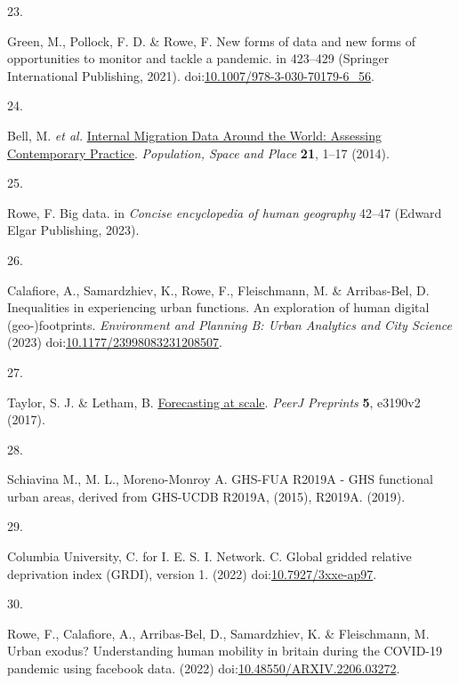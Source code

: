 \documentclass[
  11pt,
]{article}
\newlength{\cslhangindent}
\newlength{\csllabelwidth}
\newenvironment{CSLReferences}[2] %
 {\begin{list}{}{%
  \setlength{\itemindent}{0pt}
  \setlength{\leftmargin}{0pt}
  \setlength{\parsep}{0pt}
  \ifodd #1
   \setlength{\leftmargin}{\cslhangindent}
   \setlength{\itemindent}{-1\cslhangindent}
  \fi
  \setlength{\itemsep}{#2\baselineskip}}}
 {\end{list}}
\newcommand{\CSLLeftMargin}[1]{\parbox[t]{\csllabelwidth}{\strut#1\strut}}
\newcommand{\CSLRightInline}[1]{\parbox[t]{\linewidth - \csllabelwidth}{\strut#1\strut}}
\begin{document}
\begin{CSLReferences}{0}{0}
\CSLLeftMargin{23. }%
\CSLRightInline{Green, M., Pollock, F. D. \& Rowe, F. New forms of data
and new forms of opportunities to monitor and tackle a pandemic. in
423--429 (Springer International Publishing, 2021).
doi:\href{https://doi.org/10.1007/978-3-030-70179-6_56}{10.1007/978-3-030-70179-6\_56}.}

\CSLLeftMargin{24. }%
\CSLRightInline{Bell, M. \emph{et al.}
\href{https://doi.org/10.1002/psp.1848}{Internal Migration Data Around
the World: Assessing Contemporary Practice}. \emph{Population, Space and
Place} \textbf{21}, 1--17 (2014).}

\CSLLeftMargin{25. }%
\CSLRightInline{Rowe, F. Big data. in \emph{Concise encyclopedia of
human geography} 42--47 (Edward Elgar Publishing, 2023).}

\CSLLeftMargin{26. }%
\CSLRightInline{Calafiore, A., Samardzhiev, K., Rowe, F., Fleischmann,
M. \& Arribas-Bel, D. Inequalities in experiencing urban functions. An
exploration of human digital (geo-)footprints. \emph{Environment and
Planning B: Urban Analytics and City Science} (2023)
doi:\href{https://doi.org/10.1177/23998083231208507}{10.1177/23998083231208507}.}

\CSLLeftMargin{27. }%
\CSLRightInline{Taylor, S. J. \& Letham, B.
\href{https://doi.org/10.7287/peerj.preprints.3190v2}{Forecasting at
scale}. \emph{PeerJ Preprints} \textbf{5}, e3190v2 (2017).}

\CSLLeftMargin{28. }%
\CSLRightInline{Schiavina M., M. L., Moreno-Monroy A. GHS-FUA R2019A -
GHS functional urban areas, derived from GHS-UCDB R2019A, (2015),
R2019A. (2019).}

\CSLLeftMargin{29. }%
\CSLRightInline{Columbia University, C. for I. E. S. I. Network. C.
Global gridded relative deprivation index (GRDI), version 1. (2022)
doi:\href{https://doi.org/10.7927/3xxe-ap97}{10.7927/3xxe-ap97}.}

\CSLLeftMargin{30. }%
\CSLRightInline{Rowe, F., Calafiore, A., Arribas-Bel, D., Samardzhiev,
K. \& Fleischmann, M. Urban exodus? Understanding human mobility in
britain during the COVID-19 pandemic using facebook data. (2022)
doi:\href{https://doi.org/10.48550/ARXIV.2206.03272}{10.48550/ARXIV.2206.03272}.}


\end{CSLReferences}
\end{document}
